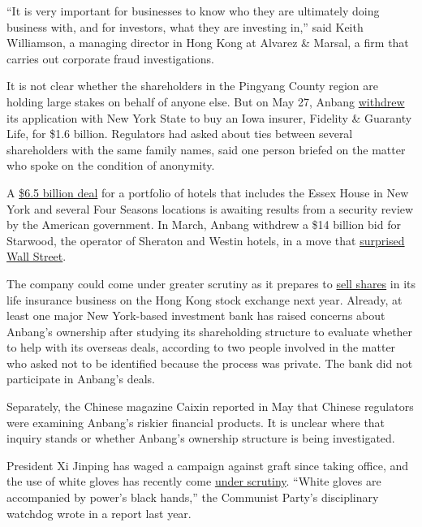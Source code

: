 ``It is very important for businesses to know who they are ultimately
doing business with, and for investors, what they are investing in,''
said Keith Williamson, a managing director in Hong Kong at Alvarez \&
Marsal, a firm that carries out corporate fraud investigations.

It is not clear whether the shareholders in the Pingyang County region
are holding large stakes on behalf of anyone else. But on May 27, Anbang
\href{http://www.nytimes.com/2016/06/02/business/dealbook/anbang-fidelity-guaranty-life.html}{withdrew}
its application with New York State to buy an Iowa insurer, Fidelity \&
Guaranty Life, for \$1.6 billion. Regulators had asked about ties
between several shareholders with the same family names, said one person
briefed on the matter who spoke on the condition of anonymity.

A
\href{http://www.nytimes.com/2016/03/14/business/dealbook/chinese-owner-of-waldorf-astoria-bets-big-on-more-us-hotels.html}{\$6.5
billion deal} for a portfolio of hotels that includes the Essex House in
New York and several Four Seasons locations is awaiting results from a
security review by the American government. In March, Anbang withdrew a
\$14 billion bid for Starwood, the operator of Sheraton and Westin
hotels, in a move that
\href{http://www.nytimes.com/2016/04/01/business/dealbook/starwood-hotels-chinese-suitor-backs-out-of-bidding.html}{surprised
Wall Street}.

The company could come under greater scrutiny as it prepares to
\href{http://www.scmp.com/business/companies/article/2008329/chinas-biggest-unlisted-insurer-anbang-poised-go-public}{sell
shares} in its life insurance business on the Hong Kong stock exchange
next year. Already, at least one major New York-based investment bank
has raised concerns about Anbang's ownership after studying its
shareholding structure to evaluate whether to help with its overseas
deals, according to two people involved in the matter who asked not to
be identified because the process was private. The bank did not
participate in Anbang's deals.

Separately, the Chinese magazine Caixin reported in May that Chinese
regulators were examining Anbang's riskier financial products. It is
unclear where that inquiry stands or whether Anbang's ownership
structure is being investigated.

President Xi Jinping has waged a campaign against graft since taking
office, and the use of white gloves has recently come
\href{http://www.nytimes.com/2015/10/31/world/asia/chinese-tycoon-wang-jianlin-defends-xis-relatives-and-himself-on-business-deal.html}{under
scrutiny}. ``White gloves are accompanied by power's black hands,'' the
Communist Party's disciplinary watchdog wrote in a report last year.

